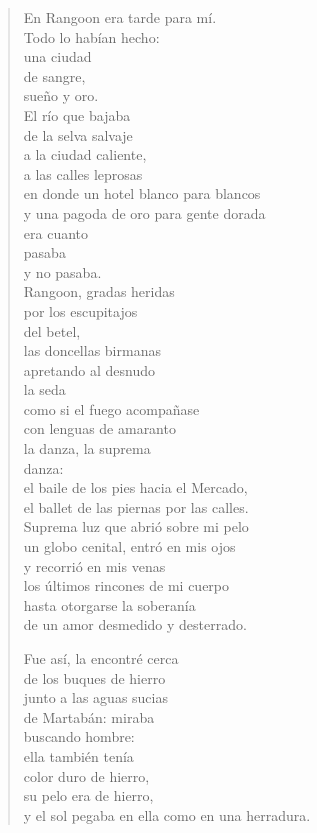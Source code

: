 \documentclass[12pt]{article}
\begin{document}
\clearpage
{}
\begin{verse}

En Rangoon era tarde para mí.\\
Todo lo habían hecho:\\
una ciudad\\
de sangre,\\
sueño y oro.\\
El río que bajaba\\
de la selva salvaje\\
a la ciudad caliente,\\
a las calles leprosas\\
en donde un hotel blanco para blancos\\
y una pagoda de oro para gente dorada\\
era cuanto\\
pasaba\\
y no pasaba.\\
Rangoon, gradas heridas\\
por los escupitajos\\
del betel,\\
las doncellas birmanas\\
apretando al desnudo\\
la seda\\
como si el fuego acompañase\\
con lenguas de amaranto\\
la danza, la suprema\\
danza:\\
el baile de los pies hacia el Mercado,\\
el ballet de las piernas por las calles.\\
Suprema luz que abrió sobre mi pelo\\
un globo cenital, entró en mis ojos\\
y recorrió en mis venas\\
los últimos rincones de mi cuerpo\\
hasta otorgarse la soberanía\\
de un amor desmedido y desterrado.  

Fue así, la encontré cerca\\
de los buques de hierro\\
junto a las aguas sucias\\
de Martabán: miraba\\
buscando hombre:\\
ella también tenía\\
color duro de hierro,\\
su pelo era de hierro,\\
y el sol pegaba en ella como en una herradura.  


\end{verse}
\end{document}
